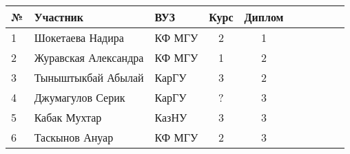 \begin{center}
\begin{tabular}{|l|l|l|c|c|c|c|c|c|c|}
\hline
№ & Участник & ВУЗ & Курс & Диплом \\
\hline
1 & Шокетаева Надира & КФ МГУ & 2 & 1 \\
\hline
2 & Журавская Александра &  КФ МГУ & 1 & 2 \\
\hline
3 & Тыныштыкбай Абылай & КарГУ & 3 & 2 \\
\hline
4 & Джумагулов Серик & КарГУ & ? & 3 \\
\hline
5 & Кабак Мухтар & КазНУ & 3 & 3 \\
\hline
6 & Таскынов Ануар & КФ МГУ & 2 & 3 \\
\hline
\end{tabular}
\end{center}


